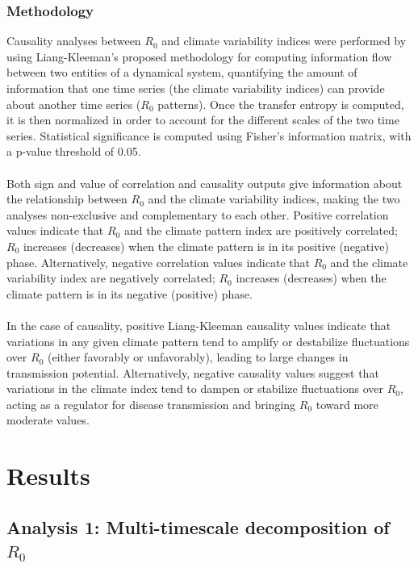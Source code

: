 \documentclass[10pt,twocolumn]{wlscirep}
\begin{document}
\subsubsection{Methodology} \label{sec-methods-3-methodology}

Causality analyses between $R_0$ and climate variability indices were performed by using Liang-Kleeman's proposed methodology for computing information flow between two entities of a dynamical system, quantifying the amount of information that one time series (the climate variability indices) can provide about another time series ($R_0$ patterns)\cite{liang_2014}. Once the transfer entropy is computed, it is then normalized in order to account for the different scales of the two time series\cite{liang_2015}. Statistical significance is computed using Fisher's information matrix, with a p-value threshold of 0.05.
\\
\\
Both sign and value of correlation and causality outputs give information about the relationship between $R_0$ and the climate variability indices, making the two analyses non-exclusive and complementary to each other. Positive correlation values indicate that $R_0$ and the climate pattern index are positively correlated; $R_0$ increases (decreases) when the climate pattern is in its positive (negative) phase. Alternatively, negative correlation values indicate that $R_0$ and the climate variability index are negatively correlated; $R_0$ increases (decreases) when the climate pattern is in its negative (positive) phase.
\\
\\
In the case of causality, positive Liang-Kleeman causality values indicate that variations in any given climate pattern tend to amplify or destabilize fluctuations over $R_0$ (either favorably or unfavorably), leading to large changes in transmission potential. Alternatively, negative causality values suggest that variations in the climate index tend to dampen or stabilize fluctuations over $R_0$, acting as a regulator for disease transmission and bringing $R_0$ toward more moderate values.


\section{Results}
\subsection{Analysis 1: Multi-timescale decomposition of $R_0$} \label{sec-results-1}
\end{document}
